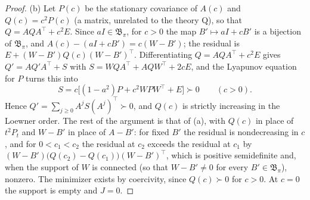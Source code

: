 \begin{proof}
(b) Let $P(c)$ be the stationary covariance of $A(c)$ and $Q(c)=c^2P(c)$ (a matrix, unrelated to the theory Q), so that $Q=AQA^\top+c^2E$. Since $aI\in\mathfrak B_\pi$, for $c>0$ the map $B'\mapsto aI+cB'$ is a bijection of $\mathfrak B_\pi$, and $A(c)-(aI+cB')=c(W-B')$; the residual is $E+(W-B')Q(c)(W-B')^\top$. Differentiating $Q=AQA^\top+c^2E$ gives $Q'=AQ'A^\top+S$ with $S=WQA^\top+AQW^\top+2cE$, and the Lyapunov equation for $P$ turns this into
\begin{equation}\label{eq:S-identity}
S=c\bigl[(1-a^2)P+c^2WPW^\top+E\bigr]\succ0\qquad(c>0).
\end{equation}
Hence $Q'=\sum_{j\ge0}A^jS(A^j)^\top\succ0$, and $Q(c)$ is strictly increasing in the Loewner order. The rest of the argument is that of (a), with $Q(c)$ in place of $t^2P_t$ and $W-B'$ in place of $A-B'$: for fixed $B'$ the residual is nondecreasing in $c$, and for $0<c_1<c_2$ the residual at $c_2$ exceeds the residual at $c_1$ by $(W-B')\bigl(Q(c_2)-Q(c_1)\bigr)(W-B')^\top$, which is positive semidefinite and, when the support of $W$ is connected (so that $W-B'\ne0$ for every $B'\in\mathfrak B_\pi$), nonzero. The minimizer exists by coercivity, since $Q(c)\succ0$ for $c>0$. At $c=0$ the support is empty and $J=0$.
\end{proof}
